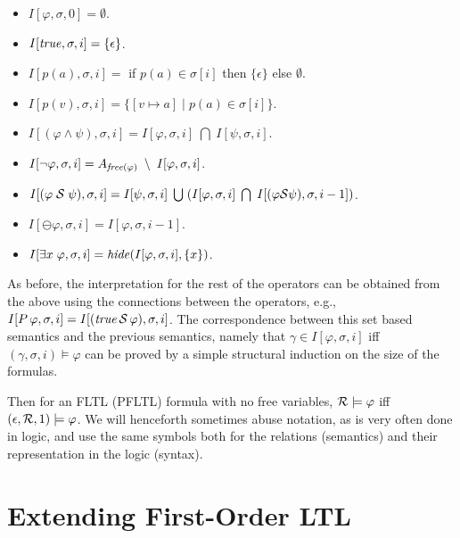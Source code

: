 \begin{itemize}
\item $I [ \varphi , \sigma , 0 ] = \emptyset$.
\item $I [ \mathit{true} , \sigma , i ] = \{ \epsilon \}$.
\item $I [ p ( a ) , \sigma , i ] =$ if $p ( a ) \in \sigma [ i ]$ then
$\{ \epsilon \}$ else $\emptyset$.
\item $I [ p ( v ) , \sigma , i ] = \{ [ v \mapsto a ] \; | \; p ( a ) \in
\sigma [ i ] \}$.
\item $I [ ( \varphi \wedge \psi ) , \sigma , i ] = 
I [ \varphi , \sigma , i ] \;  \bigcap \; I [ \psi , \sigma , i ]$.
\item $I [ \neg \varphi , \sigma , i ] = 
A_{\mathit{free} ( \varphi )} \; \setminus \; I [ \varphi , \sigma , i ]$.
\item $I [ ( \varphi \; {\cal S} \; \psi ) , \sigma , i ] = 
I [ \psi , \sigma , i ] \; \bigcup \;
( I [ \varphi , \sigma , i ] \; \bigcap \; 
I [ (\varphi {\cal S} \psi ) , \sigma , i - 1 ] )$.
\item $I [ \ominus \varphi , \sigma , i ] = I [ \varphi , \sigma , i-1 ]$.
\item $I [ \exists x \; \varphi , \sigma , i ] = 
\mathit{hide} ( I [ \varphi , \sigma , i ] , \{ x \} )$.
\end{itemize}

\noindent
As before, the interpretation for the rest of the operators can
be obtained from the above using the connections between the operators,
e.g., $I [ P \, \varphi  , \sigma , i ] = 
I [ ( \mathit{true} \, {\cal S} \, \varphi ) , \sigma , i ]$.
The correspondence between this set based semantics 
and the previous semantics, namely that
$\gamma \in I [ \varphi , \sigma, i ]$ iff
$( \gamma , \sigma , i ) \models \varphi$
can be proved by a simple structural induction on
the size of the formulas.
 \fi

Then for an FLTL (PFLTL) formula with no free variables, ${\cal R} \models \varphi$ iff $( \epsilon , {\cal R} , 1 ) \models \varphi$.
We will henceforth sometimes abuse notation, as is very often done in logic, and use the same
symbols both for the relations (semantics) and their representation in
the logic (syntax).

\section{Extending First-Order LTL}


